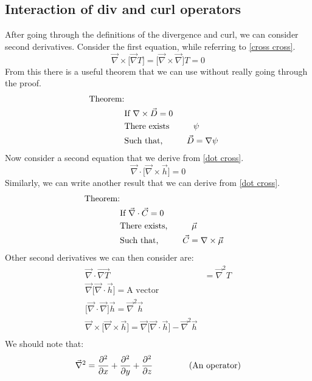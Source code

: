 \subsection{Interaction of div and curl operators}
After going through the definitions of the divergence and curl, we can consider second derivatives. Consider the first equation, while referring to \autoref{cross cross}.
\begin{equation}
\vec{\nabla} \times \Big[ \vec{\nabla} T \Big] = \Big[ \vec{\nabla} \times \vec{\nabla} \Big]T = 0
\end{equation}
From this there is a useful theorem that we can use without really going through the proof. 
\begin{align*}
	\label{curl grad}
	\text{Theorem:}\\
		&\text{If $\nabla \times \vec{D}$} = 0\\
		&\text{There exists} \hspace{10mm}  \psi\\
		&\text{Such that,} \hspace{10mm} \vec{D} = \nabla \psi
\end{align*}
Now consider a second equation that we derive from \autoref{dot cross}. 
\begin{equation}
	\vec{\nabla} \cdot \Big[ \vec{\nabla} \times \vec{h} \Big] = 0
\end{equation}
Similarly, we can write another result that we can derive from \autoref{dot cross}. 
\begin{align*}
	\label{div curl}
	\text{Theorem:}\\
		&\text{If $\vec{\nabla} \cdot \vec{C}  = 0$}\\
		&\text{There exists,} \hspace{10mm} \vec{\mu}\\
		&\text{Such that,} \hspace{10mm} \vec{C} = \nabla \times \vec{\mu}
\end{align*}
Other second derivatives we can then consider are: 
\begin{align}
	\vec{\nabla} \cdot \vec{\nabla T} &= \vec{\nabla}^{2}T\\
	\vec{\nabla} \Big[ \vec{\nabla} \cdot \vec{h} \Big] = \text{A vector}\\
	\Big[ \vec{\nabla} \cdot \vec{\nabla} \Big]\vec{h} = \vec{\nabla}^{2}\vec{h}\\
	\vec{\nabla} \times \Big[ \vec{\nabla} \times \vec{h} \Big] = \vec{\nabla}\Big[ \vec{\nabla} \cdot \vec{h} \Big] - \vec{\nabla}^{2}\vec{h}\\
\end{align} 
We should note that: 
\begin{equation} 
	\vec{\nabla}^{2} = \frac{\partial^{2}}{\partial x} + \frac{\partial^{2}}{\partial y} + \frac{\partial^{2}}{\partial z} \hspace{15mm} \text{(An operator)}
\end{equation}

